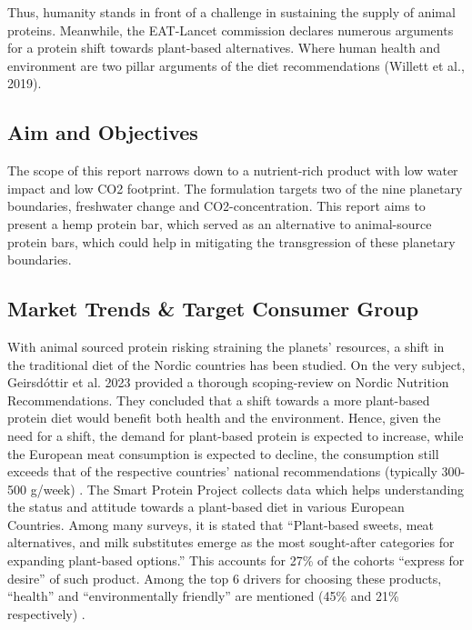 Thus, humanity stands in front of a challenge in sustaining the supply of animal proteins. Meanwhile, the EAT-Lancet commission declares numerous arguments for a protein shift towards plant-based alternatives. Where human health and environment are two pillar arguments of the diet recommendations (Willett et al., 2019).

\subsection{Aim and Objectives}
The scope of this report narrows down to a nutrient-rich product with low water impact and low CO2  footprint. The formulation targets two of the nine planetary boundaries, freshwater change and CO2-concentration. This report aims to present a hemp protein bar, which served as an alternative to animal-source protein bars, which could help in mitigating the transgression of these planetary boundaries. 

\subsection{Market Trends \& Target Consumer Group}
With animal sourced protein risking straining the planets' resources, a shift in the traditional diet of the Nordic countries has been studied. On the very subject, Geirsdóttir et al. 2023 provided a thorough scoping-review on Nordic Nutrition Recommendations. They concluded that a shift towards a more plant-based protein diet would benefit both health and the environment. Hence, given the need for a shift, the demand for plant-based protein is expected to increase, while the European meat consumption is expected to decline, the consumption still exceeds that of the respective countries' national recommendations (typically 300-500 g/week) \cite*{OECDFAO2023Outlook}. The Smart Protein Project collects data which helps understanding the status and attitude towards a plant-based diet in various European Countries. Among many surveys, it is stated that “Plant-based sweets, meat alternatives, and milk substitutes emerge as the most sought-after categories for expanding plant-based options.” This accounts for 27\% of the cohorts “express for desire” of such product. Among the top 6 drivers for choosing these products, “health” and “environmentally friendly” are mentioned (45\% and 21\% respectively) \cite*[prenote][postnote]{ProVeg2023EvolvingAppetites}.

